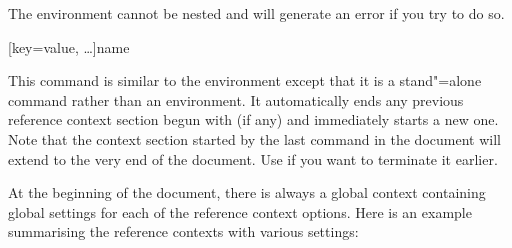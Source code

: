 \begin{ltxsyntax}
The  environment cannot be nested and \biblatex will generate an error if you try to do so.

[key=value, \dots]{name}

This command is similar to the  environment except that it is a stand"=alone command rather than an environment. It automatically ends any previous reference context section begun with  (if any) and immediately starts a new one. Note that the context section started by the last  command in the document will extend to the very end of the document. Use  if you want to terminate it earlier.
\end{ltxsyntax}
%
At the beginning of the document, there is always a global context containing global settings for each of the reference context options. Here is an example summarising the reference contexts with various settings:


\begin{ltxexample}[style=latex]{}
\usepackage[sorting=nty]{biblatex}





\begin{refcontext}{testrc}
\end{refcontext}

\begin{refcontext}[labelprefix=A]{testrc}
\end{refcontext}

\begin{refcontext}[sorting=ydnt,labelprefix=A]
\end{refcontext}

\newrefcontext}[labelprefix=B]
\endrefcontext

\newrefcontext}[sorting=ynt,labelprefix=C]{testrc}
\endrefcontext
\end{ltxexample}

